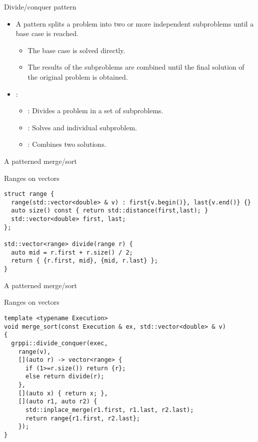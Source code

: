 \begin{frame}[t]{Divide/conquer pattern}
\begin{itemize}
  \item A  pattern splits a problem into two or more independent subproblems until a base case is reached.
    \begin{itemize}
      \item The base case is solved directly.
      \item The results of the subproblems are combined until the final solution of the original problem is obtained.
    \end{itemize}

  \vfill\pause
  \item {}:
    \begin{itemize}
      \item {}: Divides a problem in a set of subproblems.
      \item {}: Solves and individual subproblem.
      \item {}: Combines two solutions.
    \end{itemize}
\end{itemize}
\end{frame}

\begin{frame}[t,fragile]{A patterned merge/sort}
\begin{block}{Ranges on vectors}
\begin{lstlisting}
struct range {
  range(std::vector<double> & v) : first{v.begin()}, last{v.end()} {}
  auto size() const { return std::distance(first,last); }
  std::vector<double> first, last;
};

std::vector<range> divide(range r) {
  auto mid = r.first + r.size() / 2;
  return { {r.first, mid}, {mid, r.last} };
}
\end{lstlisting}
\end{block}
\end{frame}

\begin{frame}[t,fragile]{A patterned merge/sort}
\begin{block}{Ranges on vectors}
\begin{lstlisting}
template <typename Execution>
void merge_sort(const Execution & ex, std::vector<double> & v)
{
  grppi::divide_conquer(exec,
    range(v),
    [](auto r) -> vector<range> {
      if (1>=r.size()) return {r};
      else return divide(r);
    },
    [](auto x) { return x; },
    [](auto r1, auto r2) {
      std::inplace_merge(r1.first, r1.last, r2.last);
      return range{r1.first, r2.last};
    });
}
\end{lstlisting}
\end{block}
\end{frame}
